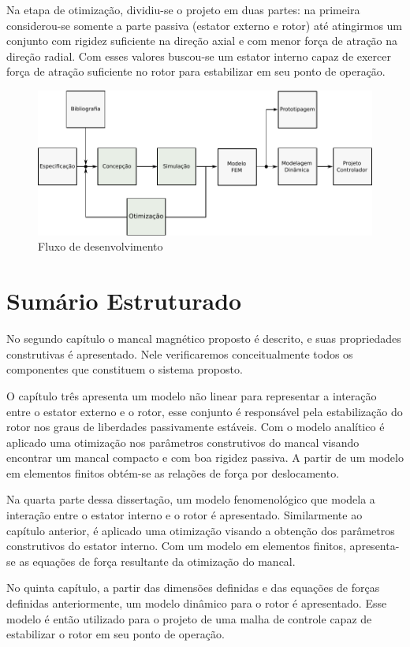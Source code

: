 Na etapa de otimização, dividiu-se o projeto em duas partes: na primeira considerou-se somente a parte passiva (estator externo e rotor) até atingirmos um conjunto com rigidez suficiente na direção axial e com menor força de atração na direção radial. Com esses valores buscou-se um estator interno capaz de exercer força de atração suficiente no rotor para estabilizar em seu ponto de operação.
 
\begin{figure}[th!]
	\centering
	\includegraphics[width=1\linewidth]{Figs/metodologia_fluxo_dev}
	\caption{Fluxo de desenvolvimento}
	\label{fig:metodologia:fluxo:dev}
\end{figure} 
 
\section{Sumário Estruturado}
 
No segundo capítulo o mancal magnético proposto é descrito, e suas propriedades construtivas é apresentado. Nele verificaremos conceitualmente todos os componentes que constituem o sistema proposto.

O capítulo três apresenta um modelo não linear para representar a interação entre o estator externo e o rotor, esse conjunto é responsável pela estabilização do rotor nos graus de liberdades passivamente estáveis. Com o modelo analítico é aplicado uma otimização nos parâmetros construtivos do mancal visando encontrar um mancal compacto e com boa rigidez passiva. A partir de um modelo em elementos finitos obtém-se as relações de força por deslocamento.

Na quarta parte dessa dissertação, um modelo fenomenológico que modela a interação entre o estator interno e o rotor é apresentado. Similarmente ao capítulo anterior, é aplicado uma otimização visando a obtenção dos parâmetros construtivos do estator interno. Com um modelo em elementos finitos, apresenta-se as equações de força resultante da otimização do mancal.  

No quinta capítulo, a partir das dimensões definidas e das equações de forças definidas anteriormente, um modelo dinâmico para o rotor é apresentado. Esse modelo é então utilizado para o projeto de uma malha de controle capaz de estabilizar o rotor em seu ponto de operação.



